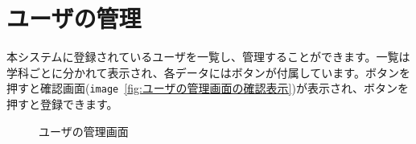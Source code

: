 \documentclass[11ptm]{jsarticle}
\begin{document}
\clearpage
\section{ユーザの管理}
\label{sec:ユーザの管理}
本システムに登録されているユーザを一覧し、管理することができます。一覧は学科ごとに分かれて表示され、各データにはボタンが付属しています。ボタンを押すと確認画面({\tt image}\ \ref{fig:ユーザの管理画面の確認表示})が表示され、ボタンを押すと登録できます。
\begin{figure}[h]
  \centering
  \begin{minipage}[h]{0.6\linewidth}
    \centering
    \caption{\label{fig:ユーザの管理画面}ユーザの管理画面}
  \end{minipage}
  \hfill
  \begin{minipage}[h]{0.3\linewidth}
    \centering
    \begin{minipage}[h]{\linewidth}

\end{minipage}
\end{minipage}
\end{figure}
\end{document}
